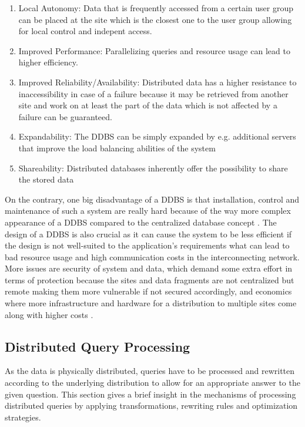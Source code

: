 \begin{enumerate}
    \item Local Autonomy: Data that is frequently accessed from a certain user group can be placed at the site which is the closest one to the user group
            allowing for local control and indepent access.
    \item Improved Performance: Parallelizing queries and resource usage can lead to higher efficiency.
    \item Improved Reliability/Availability: Distributed data has a higher resistance to inaccessibility in case of a failure because it may be retrieved 
            from another site and work on at least the part of the data which is not affected by a failure can be guaranteed. 
    \item Expandability: The DDBS can be simply expanded by e.g. additional servers that improve the load balancing abilities of the system
    \item Shareability: Distributed databases inherently offer the possibility to share the stored data
\end{enumerate}

On the contrary, one big disadvantage of a DDBS is that installation, control and maintenance of such a system are really hard because of the way
more complex appearance of a DDBS compared to the centralized database concept \citep{Jadhav2017}. The design of a DDBS is also crucial as it can cause 
the system to be less efficient if the design is not well-suited to the application's requirements what can lead to bad resource usage and high
communication costs in the interconnecting network. More issues are security of system and data, which demand some extra effort in terms of protection
because the sites and data fragments are not centralized but remote making them more vulnerable if not secured accordingly, and economics where more
infrastructure and hardware for a distribution to multiple sites come along with higher costs \cite{Kumar2013}.


\subsection{Distributed Query Processing}
\label{sec:theo_dqp}
As the data is physically distributed, queries have to be processed and rewritten according to the underlying distribution to allow for an appropriate
answer to the given question. This section gives a brief insight in the mechanisms of processing distributed queries by applying transformations, rewriting
rules and optimization strategies.

